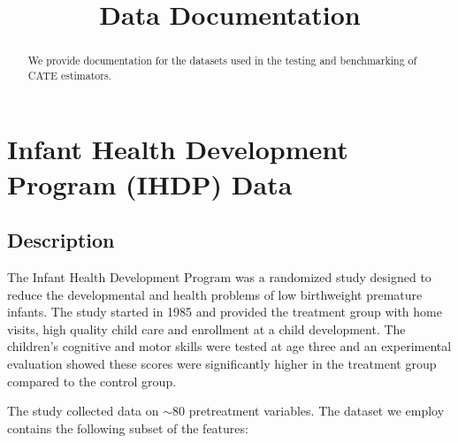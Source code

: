 \documentclass[10pt,letterpaper]{article}
\title{Data Documentation}
\begin{document}
	\maketitle    
	\date{}
	\begin{abstract}
		We provide documentation for the datasets used in the testing and benchmarking of CATE estimators. 
	\end{abstract}
	
	\section{Infant Health Development Program (IHDP) Data}
	\subsection{Description}
	The Infant Health Development Program was a randomized study designed to reduce the developmental and health problems of low birthweight premature infants. The study started in 1985 and provided the treatment group with home visits, high quality child care and enrollment at a child development. The children's cognitive and motor skills were tested at age three and an experimental evaluation showed these scores were significantly higher in the treatment group compared to the control group. 
	
		The study collected data on $\sim$80 pretreatment variables. The dataset we employ contains the following subset of the features:
	
\end{document}
